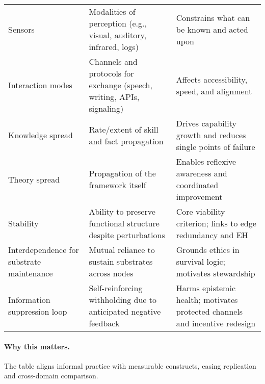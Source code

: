 \documentclass[12pt]{article}
\begin{document}
\begin{table}[htbp]
\begin{tabularx}{\linewidth}{lYY}
Sensors & Modalities of perception (e.g., visual, auditory, infrared, logs) & Constrains what can be known and acted upon \\
Interaction modes & Channels and protocols for exchange (speech, writing, APIs, signaling) & Affects accessibility, speed, and alignment \\
Knowledge spread & Rate/extent of skill and fact propagation & Drives capability growth and reduces single points of failure \\
Theory spread & Propagation of the framework itself & Enables reflexive awareness and coordinated improvement \\
Stability & Ability to preserve functional structure despite perturbations & Core viability criterion; links to edge redundancy and EH \\
Interdependence for substrate maintenance & Mutual reliance to sustain substrates across nodes & Grounds ethics in survival logic; motivates stewardship \\
Information suppression loop & Self-reinforcing withholding due to anticipated negative feedback & Harms epistemic health; motivates protected channels and incentive redesign \\
\bottomrule
\end{tabularx}
\end{table}

\paragraph{Why this matters.} The table aligns informal practice with measurable constructs, easing replication and cross-domain comparison.
\end{document}
